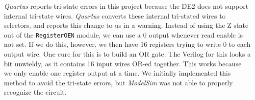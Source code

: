 \emph{Quartus} reports tri-state errors in this project because the DE2 does not support internal tri-state wires.
\emph{Quartus} converts these internal tri-stated wires to selectors, and reports this change to us in a warning.
Instead of using the Z state out of the \verb|RegisterOEN| module, we can use a 0 output whenever read enable is not set.
If we do this, however, we then have 16 registers trying to write 0 to each output wire.
One cure for this is to build an OR gate.
The Verilog for this looks a bit unwieldy, as it contains 16 input wires OR-ed together.
This works because we only enable one register output at a time.
We initially implemented this method to avoid the tri-state errors, but \emph{ModelSim} was not able to properly recognize the circuit.

